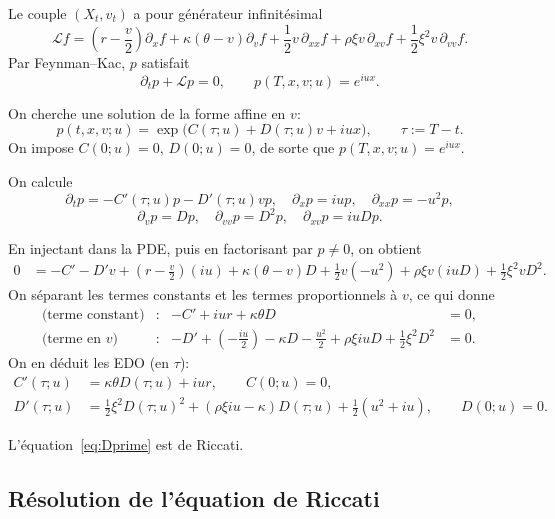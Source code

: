 \documentclass[11pt,a4paper]{article}
\newcommand{\1}{\mathbf{1}}
\begin{document}
Le couple $(X_t,v_t)$ a pour g\'en\'erateur infinit\'esimal
\begin{equation}
\mathcal{L} f =
\left(r - \frac{v}{2}\right)\partial_x f
+ \kappa(\theta - v)\partial_v f
+ \frac{1}{2} v\,\partial_{xx} f
+ \rho\xi v\,\partial_{xv} f
+ \frac{1}{2}\xi^2 v\,\partial_{vv} f.
\end{equation}
Par Feynman--Kac, $p$ satisfait
\begin{equation}
\partial_t p + \mathcal{L}p = 0, \qquad p(T,x,v;u) = e^{iux}.
\end{equation}

On cherche une solution de la forme affine en $v$:
\begin{equation}
p(t,x,v;u) = \exp\!\big(C(\tau;u) + D(\tau;u)v + iux\big),
\qquad \tau := T-t.
\end{equation}
On impose $C(0;u)=0$, $D(0;u)=0$, de sorte que $p(T,x,v;u)=e^{iux}$.

On calcule
\[
\partial_t p = -C'(\tau;u)p - D'(\tau;u)v p,\quad
\partial_x p = iup,\quad
\partial_{xx}p = -u^2p,
\]
\[
\partial_v p = Dp,\quad
\partial_{vv}p = D^2p,\quad
\partial_{xv}p = i u D p.
\]

En injectant dans la PDE, puis en factorisant par $p\neq0$, on obtient
\begin{align}
0 &= -C' - D'v
+ \left(r - \frac{v}{2}\right)(iu)
+ \kappa(\theta - v)D
+ \frac{1}{2} v(-u^2)
+ \rho\xi v(iuD)
+ \frac{1}{2}\xi^2 v D^2.
\end{align}
On s\'eparant les termes constants et les termes proportionnels \`a $v$, ce qui donne
\begin{align}
\text{(terme constant)}  &:& -C' + iur + \kappa\theta D &= 0,\\
\text{(terme en $v$)}    &:& -D'
 + \left(-\frac{iu}{2}\right)
 - \kappa D
 - \frac{u^2}{2}
 + \rho\xi iu D
 + \frac{1}{2}\xi^2 D^2 &= 0.
\end{align}
On en d\'eduit les EDO (en $\tau$):
\begin{align}
C'(\tau;u) &= \kappa\theta D(\tau;u) + i u r, \qquad C(0;u)=0,
\label{eq:Cprime}\\[3pt]
D'(\tau;u) &= \frac{1}{2}\xi^2 D(\tau;u)^2
           + (\rho\xi i u - \kappa)D(\tau;u)
           + \frac{1}{2}(u^2 + i u),\qquad D(0;u)=0.
\label{eq:Dprime}
\end{align}

L'\'equation~\eqref{eq:Dprime} est de Riccati.

\subsection{R\'esolution de l'\'equation de Riccati}
\end{document}

